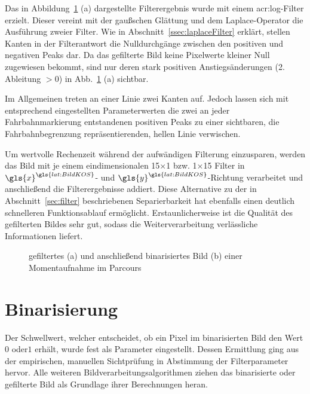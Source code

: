 Das in Abbildung~\ref{fig:bildvorverarbeitung_filtern} (a) dargestellte Filterergebnis wurde mit einem \gls{acr:log}-Filter erzielt. Dieser vereint mit der gaußschen Glättung und dem Laplace-Operator die Ausführung zweier Filter. Wie in Abschnitt~\ref{ssec:laplaceFilter} erklärt, stellen Kanten in der Filterantwort die Nulldurchgänge zwischen den positiven und negativen Peaks dar. Da das gefilterte Bild keine Pixelwerte kleiner Null zugewiesen bekommt, sind nur deren stark positiven Anstiegsänderungen (2. Ableitung \( > 0\)) in Abb.~\ref{fig:bildvorverarbeitung_filtern} (a) sichtbar. 

Im Allgemeinen treten an einer Linie zwei Kanten auf. Jedoch lassen sich mit entsprechend eingestellten Parameterwerten die zwei an jeder Fahrbahnmarkierung entstandenen positiven Peaks zu einer sichtbaren, die Fahrbahnbegrenzung repräsentierenden, hellen Linie verwischen. 

Um wertvolle Rechenzeit während der aufwändigen Filterung einzusparen, werden das Bild mit je einem eindimensionalen 15\( \times \)1 bzw. 1\( \times \)15 Filter in \( {\gls{x}}^{\gls{lat:BildKOS}} \)- und \( {\gls{y}}^{\gls{lat:BildKOS}} \)-Richtung verarbeitet und anschließend die Filterergebnisse addiert. Diese Alternative zu der in Abschnitt~\ref{sec:filter} beschriebenen Separierbarkeit hat ebenfalls einen deutlich schnelleren Funktionsablauf ermöglicht. Erstaunlicherweise ist die Qualität des gefilterten Bildes sehr gut, sodass die Weiterverarbeitung verlässliche Informationen liefert.


\begin{figure}[hbtp] %
  \centering
  \qquad
  \caption{gefiltertes (a) und anschließend binarisiertes Bild (b) einer Momentaufnahme im Parcours}
\label{fig:bildvorverarbeitung_filtern}
\end{figure} 

\section{Binarisierung}
\label{sec:bildvorverarbeitung:binarisierung}
Der Schwellwert, welcher entscheidet, ob ein Pixel im binarisierten Bild den Wert \glqq \(0\)\grqq{} oder\glqq \(1\)\grqq{} erhält, wurde fest als Parameter eingestellt. Dessen Ermittlung ging aus der empirischen, manuellen Sichtprüfung in Abstimmung der Filterparameter hervor. Alle weiteren Bildverarbeitungsalgorithmen ziehen das binarisierte oder gefilterte Bild als Grundlage ihrer Berechnungen heran.